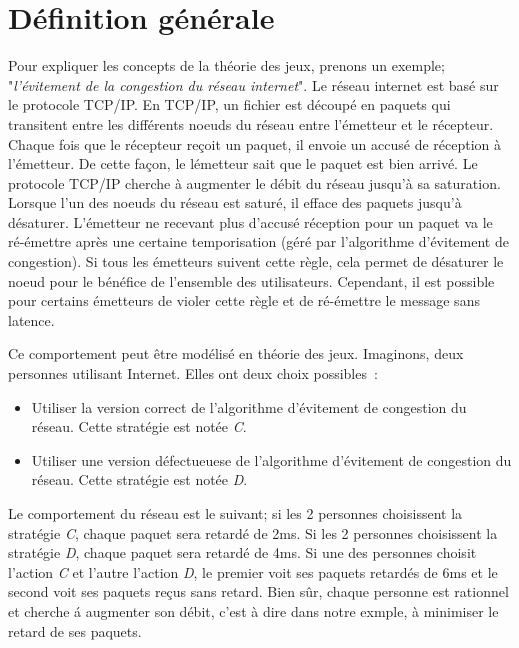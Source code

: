 \section{D\'efinition g\'en\'erale}
Pour expliquer les concepts de la th\'eorie des jeux, prenons un exemple; "\emph{l'\'evitement de la congestion du r\'eseau internet}". Le r\'eseau internet est bas\'e sur le protocole TCP/IP. En TCP/IP, un fichier est d\'ecoup\'e en paquets qui transitent entre les diff\'erents noeuds du r\'eseau entre l'\'emetteur et le r\'ecepteur. Chaque fois que le r\'ecepteur re\c{c}oit un paquet, il envoie un accus\'e de r\'eception \`a l'\'emetteur. De cette fa\c{c}on, le l\'emetteur sait que le paquet est bien arriv\'e. Le protocole TCP/IP cherche \`a augmenter le d\'ebit du r\'eseau jusqu'\`a sa saturation. Lorsque l'un des noeuds du r\'eseau est satur\'e, il efface des paquets jusqu'\`a d\'esaturer. L'\'emetteur ne recevant plus d'accus\'e r\'eception pour un paquet va le r\'e-\'emettre apr\`es une certaine temporisation (g\'er\'e par l'algorithme d'\'evitement de congestion). Si tous les \'emetteurs suivent cette r\`egle, cela  permet de d\'esaturer le noeud pour le b\'en\'efice de l'ensemble des utilisateurs. Cependant, il est possible pour certains \'emetteurs de violer cette r\`egle et de r\'e-\'emettre le message sans latence. 

Ce comportement peut \^etre mod\'elis\'e en th\'eorie des jeux.  Imaginons, deux personnes utilisant Internet. Elles ont deux choix possibles\ :
\begin{itemize}
\item Utiliser la version correct de l'algorithme d'\'evitement de congestion du r\'eseau. Cette strat\'egie est not\'ee \emph{C}.
\item Utiliser une version d\'efectueuese de l'algorithme d'\'evitement de congestion du r\'eseau. Cette strat\'egie est not\'ee \emph{D}.
\end{itemize}

Le comportement du r\'eseau est le suivant; si les 2 personnes choisissent la strat\'egie \emph{C}, chaque paquet sera retard\'e de 2ms. Si les 2 personnes choisissent la strat\'egie \emph{D}, chaque paquet sera retard\'e de 4ms. Si une des personnes choisit l'action \emph{C} et l'autre l'action \emph{D}, le premier voit ses paquets retard\'es de 6ms et le second voit ses paquets re\c{c}us sans retard. Bien s\^ur, chaque personne est rationnel et cherche \'a augmenter son d\'ebit, c'est \`a dire dans notre exmple, \`a minimiser le retard de ses paquets.


